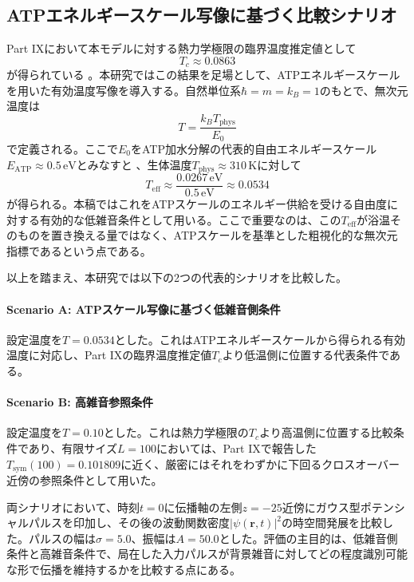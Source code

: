 \documentclass[a4paper,11pt,ja=standard,lualatex]{bxjsarticle}
\begin{document}
\subsection{ATPエネルギースケール写像に基づく比較シナリオ}
Part IXにおいて本モデルに対する熱力学極限の臨界温度推定値として
\begin{equation}
T_c \approx 0.0863
\end{equation}
が得られている \cite{Konno2025v9}。本研究ではこの結果を足場として、ATPエネルギースケールを用いた有効温度写像を導入する。自然単位系$\hbar = m = k_B = 1$のもとで、無次元温度は
\begin{equation}
T = \frac{k_B T_{\mathrm{phys}}}{E_0}
\end{equation}
で定義される。ここで$E_0$をATP加水分解の代表的自由エネルギースケール$E_{\mathrm{ATP}} \approx 0.5\,\mathrm{eV}$とみなすと \cite{Phillips2012, Milo2015}、生体温度$T_{\mathrm{phys}} \approx 310\,\mathrm{K}$に対して
\begin{equation}
T_{\mathrm{eff}} \approx \frac{0.0267\,\mathrm{eV}}{0.5\,\mathrm{eV}} \approx 0.0534
\end{equation}
が得られる。本稿ではこれをATPスケールのエネルギー供給を受ける自由度に対する有効的な低雑音条件として用いる。ここで重要なのは、この$T_{\mathrm{eff}}$が浴温そのものを置き換える量ではなく、ATPスケールを基準とした粗視化的な無次元指標であるという点である。

以上を踏まえ、本研究では以下の2つの代表的シナリオを比較した。

\paragraph{Scenario A: ATPスケール写像に基づく低雑音側条件}
設定温度を$T = 0.0534$とした。これはATPエネルギースケールから得られる有効温度に対応し、Part IXの臨界温度推定値$T_c$より低温側に位置する代表条件である。

\paragraph{Scenario B: 高雑音参照条件}
設定温度を$T = 0.10$とした。これは熱力学極限の$T_c$より高温側に位置する比較条件であり、有限サイズ$L=100$においては、Part IXで報告した$T_{\mathrm{sym}}(100)=0.101809$に近く、厳密にはそれをわずかに下回るクロスオーバー近傍の参照条件として用いた。

両シナリオにおいて、時刻$t=0$に伝播軸の左側$z=-25$近傍にガウス型ポテンシャルパルスを印加し、その後の波動関数密度$|\psi(\mathbf{r},t)|^2$の時空間発展を比較した。パルスの幅は$\sigma = 5.0$、振幅は$A = 50.0$とした。評価の主目的は、低雑音側条件と高雑音条件で、局在した入力パルスが背景雑音に対してどの程度識別可能な形で伝播を維持するかを比較する点にある。
\end{document}
